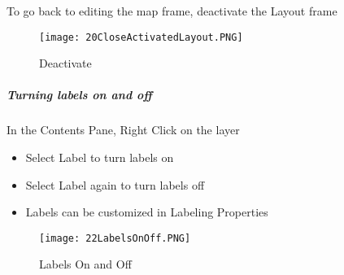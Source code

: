 To go back to editing the map frame, deactivate the Layout frame



\begin{figure}[h!]
 \centering
     \texttt{[image: 20CloseActivatedLayout.PNG]}
 \caption{Deactivate}


 \end{figure} 

\clearpage


\subparagraph{Turning labels on and off}

In the Contents Pane, Right Click on the layer

\begin{itemize}

\item Select Label to turn labels on

\item Select Label again to turn labels off

\item Labels can be customized in Labeling Properties

\end{itemize}


\begin{figure}[h!]
 \centering
     \texttt{[image: 22LabelsOnOff.PNG]}
 \caption{Labels On and Off}

 \end{figure}
 



